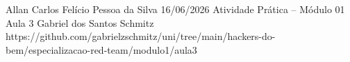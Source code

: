 \documentclass{article}
\begin{document}
{Allan Carlos Felício Pessoa da Silva}
{16/06/2026}
{Atividade Prática -- Módulo 01}
{Aula 3}
{Gabriel dos Santos Schmitz}
{https://github.com/gabrielzschmitz/uni/tree/main/hackers-do-bem/especializacao-red-team/modulo1/aula3}









\newpage
\printbibliography[title=Referências]
\end{document}
